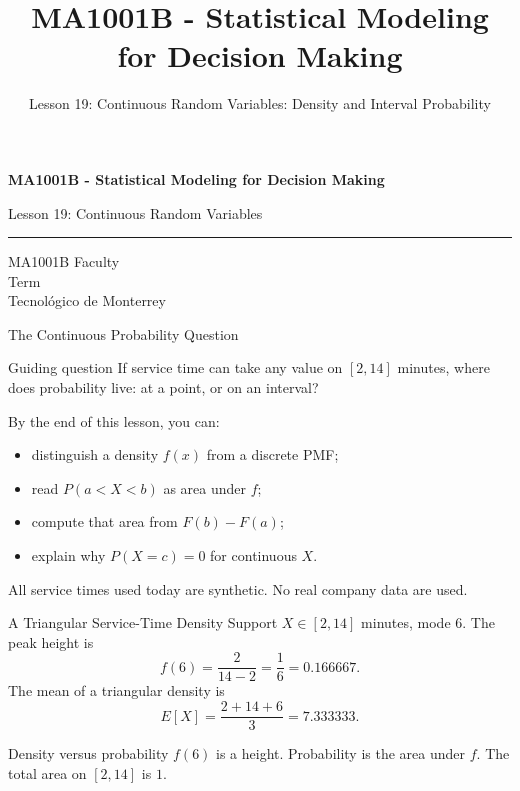 \documentclass[aspectratio=169,10pt,english]{beamer}
\title{MA1001B - Statistical Modeling for Decision Making}
\subtitle{Lesson 19: Continuous Random Variables: Density and Interval Probability}
\author{}
\institute{Tecnol\'ogico de Monterrey}
\date{}
\begin{document}
\begin{frame}[plain]
  \vspace{1.2cm}
  {\Large\bfseries MA1001B - Statistical Modeling for Decision Making\par}
  \vspace{0.7cm}
  {\large Lesson 19: Continuous Random Variables\par}
  \vspace{0.7cm}
  {\color{TecRojo}\rule{\textwidth}{1.2pt}}
  \vspace{0.8cm}

  MA1001B Faculty\\[0.3cm]
  Term\\[0.3cm]
  Tecnol\'ogico de Monterrey
\end{frame}

\begin{frame}{The Continuous Probability Question}
  \begin{alertblock}{Guiding question}
    If service time can take any value on $[2, 14]$ minutes, where does
    probability live: at a point, or on an interval?
  \end{alertblock}

  \vspace{0.6em}
  By the end of this lesson, you can:
  \begin{itemize}
    \item distinguish a density $f(x)$ from a discrete PMF;
    \item read $P(a<X<b)$ as area under $f$;
    \item compute that area from $F(b)-F(a)$;
    \item explain why $P(X=c)=0$ for continuous $X$.
  \end{itemize}

  \vfill
  \scriptsize All service times used today are synthetic. No real company data are used.
\end{frame}

\begin{frame}{A Triangular Service-Time Density}
  \small
  Support $X\in[2,14]$ minutes, mode $6$. The peak height is
  \[
    f(6)=\frac{2}{14-2}=\frac{1}{6}=0.166667.
  \]
  The mean of a triangular density is
  \[
    E[X]=\frac{2+14+6}{3}=7.333333.
  \]

  \vspace{0.4em}
  \begin{exampleblock}{Density versus probability}
    $f(6)$ is a height. Probability is the area under $f$. The total area
    on $[2,14]$ is $1$.
  \end{exampleblock}
\end{frame}
\end{document}
